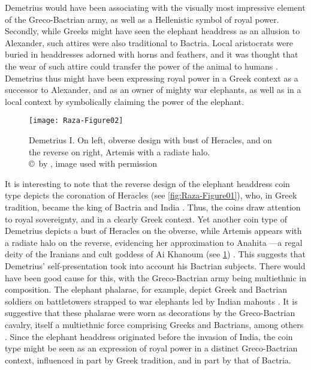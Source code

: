 \documentclass{ijsra}
\begin{document}
Demetrius would have been associating with the visually most impressive element of the Greco-Bactrian army,
as well as a Hellenistic symbol of royal power.
Secondly, while Greeks might have seen the elephant headdress as an allusion to Alexander, such attires were also traditional to Bactria.
Local aristocrats were buried in headdresses adorned with horns and feathers,
and it was thought that the wear of such attire could transfer the power of the animal to humans \parencite[215--226]{Lerner2009}.
Demetrius thus might have been expressing royal power in a Greek context as a successor to Alexander,
and as an owner of mighty war elephants, as well as in a local context by symbolically claiming the power of the elephant.

\begin{figure}[!htb] %
	\centering
	\texttt{[image: Raza-Figure02]}
	\caption{Demetrius I. On left, obverse design with bust of Heracles, and on the reverse on right, Artemis with a radiate halo. 
		{\normalfont\scriptsize \\ \copyright\ by \cite{Coin}, image used with permission}}
	\label{fig:Raza-Figure02}
\end{figure}

It is interesting to note that the reverse design of the elephant headdress coin type depicts the coronation of Heracles (see \cref{fig:Raza-Figure01}),
who, in Greek tradition, became the king of Bactria and India \parencites[70--80]{Bukharin2004}[140]{Stanco2012}. %
Thus, the coins draw attention to royal sovereignty, and in a clearly Greek context.
Yet another coin type of Demetrius depicts a bust of Heracles on the obverse, while Artemis appears with a radiate halo on the reverse,
evidencing her approximation to Anahita —a regal deity of the Iranians and cult goddess of Ai Khanoum (see \cref{fig:Raza-Figure02})
\parencite[242]{MacDowall2007b}.
This suggests that Demetrius’ self-presentation took into account his Bactrian subjects.
There would have been good cause for this, with the Greco-Bactrian army being multiethnic in composition.
The elephant phalarae, for example, depict Greek and Bactrian soldiers on battletowers strapped to war elephants led by Indian mahouts
\parencites[10]{Pfrommer1993}[588]{Treister1999}.
It is suggestive that these phalarae were worn as decorations by the Greco-Bactrian cavalry, itself a multiethnic force comprising
Greeks and Bactrians, among others \parencite[50--51]{Lerner1999}.
Since the elephant headdress originated before the invasion of India, the coin type might be seen as an expression of royal power
in a distinct Greco-Bactrian context, influenced in part by Greek tradition, and in part by that of Bactria.
\end{document}
